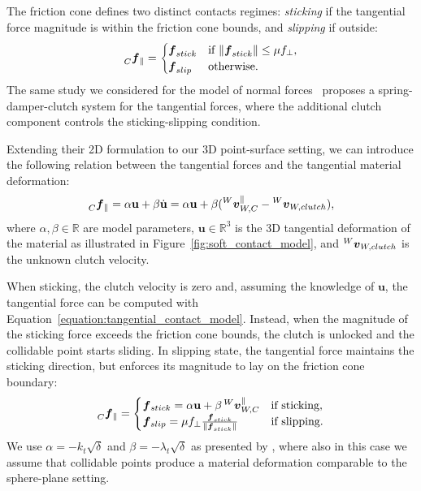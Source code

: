 The friction cone defines two distinct contacts regimes: \emph{sticking} if the tangential force magnitude is within the friction cone bounds, and \emph{slipping} if outside:
%
\begin{equation*}
    \forcelin[C]_\parallel = 
    \begin{cases}
        \boldsymbol{f}_{stick} & \text{if $\norm{\boldsymbol{f}_{stick}} \leq \mu f_\perp$,} \\
        \boldsymbol{f}_{slip} & \text{otherwise.}
    \end{cases}
\end{equation*}
%
The same study we considered for the model of normal forces~\parencite{azad_modeling_2010} proposes a spring-damper-clutch system for the tangential forces, where the additional clutch component controls the sticking-slipping condition.

Extending their 2D formulation to our 3D point-surface setting, we can introduce the following relation between the tangential forces and the tangential material deformation:
%
\begin{equation}
    \label{equation:tangential_contact_model}
    \forcelin[C]_\parallel
    = \alpha \mathbf{u} + \beta \dot{\mathbf{u}}
    = \alpha \mathbf{u} + \beta (\vellin[W]^{\parallel}_{W,C} - \vellin[W]_{W,clutch})
    ,
\end{equation}
%
where $\alpha, \beta \in \mathbb{R}$ are model parameters, $\mathbf{u} \in \mathbb{R}^3$ is the 3D tangential deformation of the material as illustrated in Figure~\ref{fig:soft_contact_model}, and $\vellin[W]_{W,clutch}$ is the unknown clutch velocity.

When sticking, the clutch velocity is zero and, assuming the knowledge of $\mathbf{u}$, the tangential force can be computed with Equation~\eqref{equation:tangential_contact_model}.
Instead, when the magnitude of the sticking force exceeds the friction cone bounds, the clutch is unlocked and the collidable point starts sliding.
In slipping state, the tangential force maintains the sticking direction, but enforces its magnitude to lay on the friction cone boundary:
%
\begin{equation}
    \label{equation:sticking_slipping_forces}
    \forcelin[C]_\parallel =
    \begin{cases}
        \forcelin_{stick} = \alpha \mathbf{u} + \beta \vellin[W]^{\parallel}_{W,C} &\text{if sticking,} \\
        \forcelin_{slip} = \mu f_\perp \frac{\boldsymbol{f}_{stick}}{\norm{\boldsymbol{f}_{stick}}} &\text{if slipping.}
    \end{cases}
\end{equation}
%
We use $\alpha = -k_t\sqrt{\delta}$ and $\beta = -\lambda_t \sqrt{\delta}$ as presented by \textcite{azad_modeling_2010}, where also in this case we assume that collidable points produce a material deformation comparable to the sphere-plane setting.

